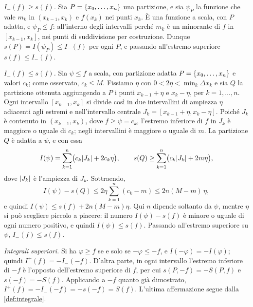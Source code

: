 \begin{dimostrazione}
\emph{$I_{-}(f)\ge s(f)$.} Sia $P=\left\{ x_{0},\dots,x_{n} \right\}$ una partizione, e sia
$\psi_{P}$ la funzione che vale $m_{k}$ in $(x_{k-1},x_{k})$ e $f(x_{k})$ nei punti
$x_{k}$. È una funzione a scala, con $P$ adatta, e $\psi_{P}\le f$: all'interno degli
intervalli perché $m_{k}$ è un minorante di $f$ in $[x_{k-1},x_{k}]$, nei punti di
suddivisione per costruzione. Dunque $s(P)=I(\psi_{P})\le I_{-}(f)$ per ogni $P$, e
passando all'estremo superiore $s(f)\le I_{-}(f)$.

\emph{$I_{-}(f)\le s(f)$.} Sia $\psi\le f$ a scala, con partizione adatta
$P=\left\{ x_{0},\dots,x_{n} \right\}$ e valori $c_{k}$; come osservato, $c_{k}\le M$. Fissiamo
$\eta$ con $0<2\eta<\min_{k}\Delta x_{k}$ e sia $Q$ la partizione ottenuta aggiungendo a
$P$ i punti $x_{k-1}+\eta$ e $x_{k}-\eta$, per $k=1,\dots,n$. Ogni intervallo
$[x_{k-1},x_{k}]$ si divide così in due intervallini di ampiezza $\eta$ adiacenti agli
estremi e nell'intervallo centrale $J_{k}=[x_{k-1}+\eta,x_{k}-\eta]$. Poiché $J_{k}$ è
contenuto in $(x_{k-1},x_{k})$, dove $f\ge\psi=c_{k}$, l'estremo inferiore di $f$ in
$J_{k}$ è maggiore o uguale di $c_{k}$; negli intervallini è maggiore o uguale di $m$.
La partizione $Q$ è adatta a $\psi$, e con essa
\[
  I(\psi)=\sum_{k=1}^{n}\bigl(c_{k}\lvert J_{k}\rvert+2c_{k}\eta\bigr), \qquad
  s(Q)\ge\sum_{k=1}^{n}\bigl(c_{k}\lvert J_{k}\rvert+2m\eta\bigr),
\]
dove $\lvert J_{k}\rvert$ è l'ampiezza di $J_{k}$. Sottraendo,
\[
  I(\psi)-s(Q)\le2\eta\sum_{k=1}^{n}(c_{k}-m)\le2n(M-m)\,\eta ,
\]
e quindi $I(\psi)\le s(f)+2n(M-m)\eta$. Qui $n$ dipende soltanto da $\psi$, mentre $\eta$
si può scegliere piccolo a piacere: il numero $I(\psi)-s(f)$ è minore o uguale di ogni
numero positivo, e quindi $I(\psi)\le s(f)$. Passando all'estremo superiore su $\psi$,
$I_{-}(f)\le s(f)$.

\emph{Integrali superiori.} Si ha $\varphi\ge f$ se e solo se $-\varphi\le-f$, e
$I(-\varphi)=-I(\varphi)$; quindi $I^{+}(f)=-I_{-}(-f)$. D'altra parte, in ogni
intervallo l'estremo inferiore di $-f$ è l'opposto dell'estremo superiore di $f$, per cui
$s(P,-f)=-S(P,f)$ e $s(-f)=-S(f)$. Applicando a $-f$ quanto già dimostrato,
$I^{+}(f)=-I_{-}(-f)=-s(-f)=S(f)$. L'ultima affermazione segue dalla
\cref{def:integrale}.
\end{dimostrazione}

